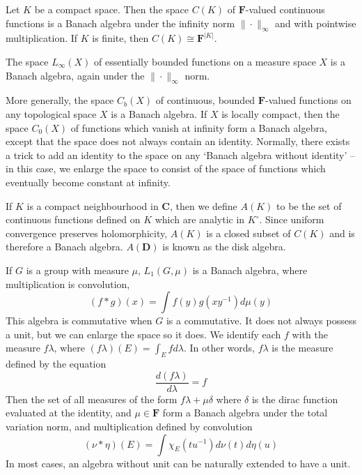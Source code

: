 \begin{example}
    Let $K$ be a compact space. Then the space $C(K)$ of $\mathbf{F}$-valued continuous functions is a Banach algebra under the infinity norm $\| \cdot \|_\infty$ and with pointwise multiplication. If $K$ is finite, then $C(K) \cong \mathbf{F}^{|K|}$.
\end{example}

\begin{example}
    The space $L_\infty(X)$ of essentially bounded functions on a measure space $X$ is a Banach algebra, again under the $\| \cdot \|_\infty$ norm.
\end{example}

\begin{example}
    More generally, the space $C_b(X)$ of continuous, bounded $\mathbf{F}$-valued functions on any topological space $X$ is a Banach algebra. If $X$ is locally compact, then the space $C_0(X)$ of functions which vanish at infinity form a Banach algebra, except that the space does not always contain an identity. Normally, there exists a trick to add an identity to the space on any `Banach algebra without identity' -- in this case, we enlarge the space to consist of the space of functions which eventually become constant at infinity.
\end{example}

\begin{example}
    If $K$ is a compact neighbourhood in $\mathbf{C}$, then we define $A(K)$ to be the set of continuous functions defined on $K$ which are analytic in $K^\circ$. Since uniform convergence preserves holomorphicity, $A(K)$ is a closed subset of $C(K)$ and is therefore a Banach algebra. $A(\mathbf{D})$ is known as the disk algebra.
\end{example}

\begin{example}
    If $G$ is a group with measure $\mu$, $L_1(G, \mu)$ is a Banach algebra, where multiplication is convolution,
    \[ (f * g)(x) = \int f(y) g(xy^{-1}) d\mu(y) \]
    This algebra is commutative when $G$ is a commutative. It does not always possess a unit, but we can enlarge the space so it does. We identify each $f$ with the measure $f \lambda$, where $(f \lambda) (E) = \int_E f d\lambda$. In other words, $f \lambda$ is the measure defined by the equation
    \[ \frac{d(f \lambda)}{d \lambda} = f \]
    Then the set of all measures of the form $f \lambda + \mu \delta$ where $\delta$ is the dirac function evaluated at the identity, and $\mu \in \mathbf{F}$ form a Banach algebra under the total variation norm, and multiplication defined by convolution
    \[ (\nu * \eta)(E) = \int \chi_E (tu^{-1}) d \nu(t) d\eta(u) \]
    In most cases, an algebra without unit can be naturally extended to have a unit.
\end{example}

